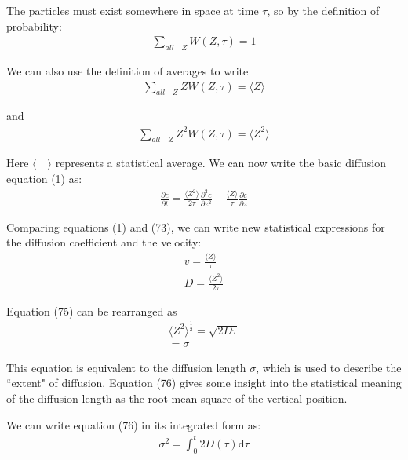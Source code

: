\documentclass[draft, jgrga]{AGUTeX}
\begin{document}
\begin{article}
The particles must exist somewhere in space at time \begin{math} \tau \end{math}, so by the definition of probability:
\begin{eqnarray}
\sum_{all \quad Z} W(Z,\tau) = 1
\end{eqnarray}

We can also use the definition of averages to write
\begin{eqnarray}
\sum_{all \quad Z} ZW (Z,\tau) = \langle Z \rangle
\end{eqnarray}

and
\begin{eqnarray}
\sum_{all \quad Z} Z^2 W (Z,\tau) = \langle Z^2 \rangle
\end{eqnarray}

Here \begin{math} \langle \quad \rangle \end{math} represents a statistical average. We can now write the basic diffusion equation (1) as:
\begin{eqnarray}
\frac {\partial c}{\partial t}
= \frac{\langle Z^2 \rangle}{2 \tau} \frac{\partial^2 c}{\partial z^2}
- \frac{\langle Z \rangle}{\tau} \frac{\partial c}{\partial z}
\end{eqnarray}

Comparing equations (1) and (73), we can write new statistical expressions for the diffusion coefficient and the velocity:
\begin{eqnarray}
v = \frac{\langle Z \rangle}{\tau} \\
D = \frac{\langle Z^2 \rangle}{2 \tau}
\end{eqnarray}

Equation (75) can be rearranged as
\begin{eqnarray}
\langle Z^2 \rangle ^\frac{1}{2}
= \sqrt{2D\tau} \\
= \sigma \nonumber
\end{eqnarray}

This equation is equivalent to the diffusion length \begin{math} \sigma \end{math}, which is used to describe the ``extent" of diffusion. Equation (76) gives some insight into the statistical meaning of the diffusion length as the root mean square of the vertical position.

We can write equation (76) in its integrated form as:
\begin{eqnarray}
\sigma^2 = \int_0^t 2 D (\tau) \mathrm{d} \tau
\end{eqnarray}


\end{article}
\end{document}
